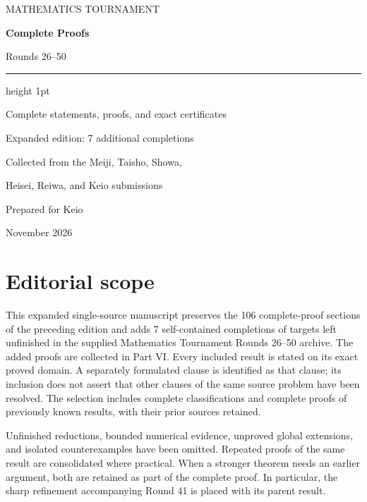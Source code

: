 \documentclass[11pt,a4paper]{article}
\numberwithin{equation}{section}
\theoremstyle{definition}
\theoremstyle{remark}
\begin{document}
\hypersetup{pageanchor=false}
\begin{titlepage}
\thispagestyle{empty}
\vspace*{19mm}
{\sffamily\color{muted}\large MATHEMATICS TOURNAMENT\par}
\vspace{8mm}
{\sffamily\bfseries\color{inkblue}\fontsize{34}{39}\selectfont Complete Proofs\par}
\vspace{4mm}
{\sffamily\color{inkblue}\fontsize{25}{30}\selectfont Rounds 26--50\par}
\vspace{10mm}
{\color{lightline}\hrule height 1pt}
\vspace{8mm}
{\Large Complete statements, proofs, and exact certificates\par}
\vspace{5mm}
{\sffamily\color{inkblue}Expanded edition: 7 additional completions\par}
\vspace{15mm}
{\large Collected from the Meiji, Taisho, Showa,\par Heisei, Reiwa, and Keio submissions\par}
\vfill
{\sffamily\color{muted}Prepared for Keio\par}
\vspace{2mm}
{ November 2026\par}
\end{titlepage}
\hypersetup{pageanchor=true}
\section*{Editorial scope}
This expanded single-source manuscript preserves the 106 complete-proof
sections of the preceding edition and adds 7 self-contained completions
of targets left unfinished in the supplied Mathematics Tournament
Rounds 26--50 archive. The added proofs are collected in Part VI. Every included result is stated
on its exact proved domain. A separately formulated clause is identified as that
clause; its inclusion does not assert that other clauses of the same source
problem have been resolved. The selection includes complete classifications and
complete proofs of previously known results, with their prior sources retained.

Unfinished reductions, bounded numerical evidence, unproved global extensions,
and isolated counterexamples have been omitted. Repeated proofs of the same result
are consolidated where practical. When a stronger theorem needs an earlier
argument, both are retained as part of the complete proof. In particular, the
sharp refinement accompanying Round 41 is placed with its parent result.
\end{document}
